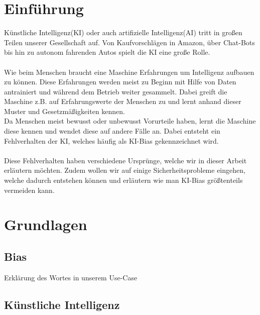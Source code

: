\documentclass[12pt,oneside,a4paper,parskip]{scrbook}
\begin{document}
\chapter{Einführung}
\label{chapter:intro}
Künstliche Intelligenz(KI) oder auch artifizielle Intelligenz(AI) tritt in großen Teilen unserer Gesellschaft auf. Von Kaufvorschlägen in Amazon, über Chat-Bots bis hin zu autonom fahrenden Autos spielt die KI eine große Rolle. 
\\\\
Wie beim Menschen braucht eine Maschine Erfahrungen um Intelligenz aufbauen zu können. Diese Erfahrungen werden meist zu Beginn mit Hilfe von Daten antrainiert und während dem Betrieb weiter gesammelt. Dabei greift die Maschine z.B. auf Erfahrungswerte der Menschen zu und lernt anhand dieser Muster und Gesetzmäßigkeiten kennen.
\\
Da Menschen meist bewusst oder unbewusst Vorurteile haben, lernt die Maschine diese kennen und wendet diese auf andere Fälle an. Dabei entsteht ein Fehlverhalten der KI, welches häufig als KI-Bias gekennzeichnet wird.
\\\\
Diese Fehlverhalten haben verschiedene Ursprünge, welche wir in dieser Arbeit erläutern möchten. Zudem wollen wir auf einige Sicherheitsprobleme eingehen, welche dadurch entstehen können und erläutern wie man KI-Bias größtenteils vermeiden kann.


\chapter{Grundlagen}
\section{Bias}
Erklärung des Wortes in unserem Use-Case

\section{Künstliche Intelligenz}
\end{document}
